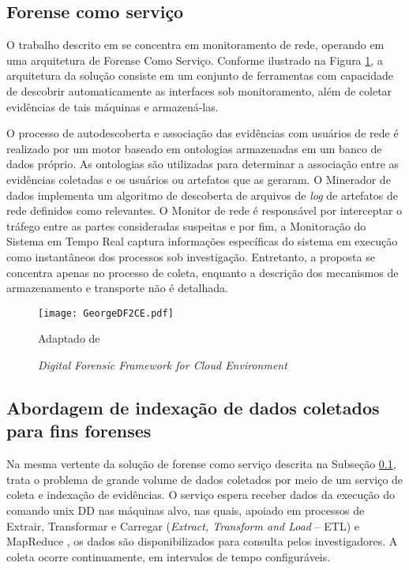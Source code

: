 \subsection{Forense como serviço}
\label{sec:frost}

O trabalho descrito em \cite{GeorgeDF2CE:2012} se concentra em monitoramento de rede, operando em uma arquitetura de Forense Como Serviço.%
%
Conforme ilustrado na Figura \ref{fig:GeorgeDF2CE}, a arquitetura da solução consiste em um conjunto de ferramentas com capacidade de descobrir automaticamente as interfaces sob monitoramento, além de coletar evidências de tais máquinas e armazená-las.


O processo de autodescoberta e associação das evidências com usuários de rede é realizado por um motor baseado em ontologias armazenadas em um banco de dados próprio. 
%
As ontologias são utilizadas para determinar a associação entre as evidências coletadas e os usuários ou artefatos que as geraram.
%
O Minerador de dados implementa um algoritmo de descoberta de arquivos de \textit{log} de artefatos de rede definidos como relevantes.
%
O Monitor de rede é responsável por interceptar o tráfego entre as partes consideradas suspeitas e por fim, a Monitoração do Sistema em Tempo Real captura informações específicas do sistema em execução como instantâneos dos processos sob investigação.
%
Entretanto, a proposta se concentra apenas no processo de coleta, enquanto a descrição dos mecanismos de armazenamento e transporte não é detalhada.


\begin{figure}[htb!]
\footnotesize
\caption{\textit{Digital Forensic Framework for Cloud Environment}}
\texttt{[image: GeorgeDF2CE.pdf]}
\centering
\label{fig:GeorgeDF2CE}
\begin{center}
Adaptado de \cite{GeorgeDF2CE:2012} 
\end{center}
\end{figure}


\subsection{Abordagem de indexação de dados coletados para fins forenses}
\label{sec:indexacaoforense}

Na mesma vertente da solução de forense como serviço descrita na Subseção \ref{sec:frost}, \cite{FaaSIndexedSearch:2012} trata o problema de grande volume de dados coletados por meio de um serviço de coleta e indexação de evidências.
%
O serviço espera receber dados da execução do comando unix DD \cite{UnixManPagesDD} nas máquinas alvo, nas quais, apoiado em processos de Extrair, Transformar e Carregar (\textit{Extract, Transform and Load} -- ETL) e MapReduce \cite{MapReduce:2008}, os dados são disponibilizados para consulta pelos investigadores.
%
A coleta ocorre continuamente, em intervalos de tempo configuráveis.


